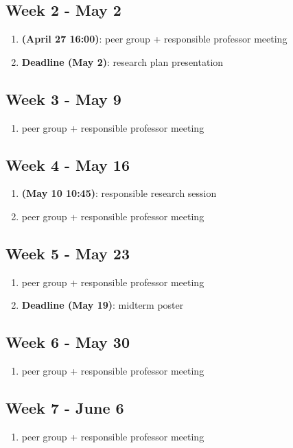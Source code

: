 \documentclass[english]{article}
\begin{document}
\subsection*{Week 2 - May 2}
\begin{enumerate}
\item \textbf{(April 27 16:00)}: peer group + responsible professor meeting
\item \textbf{Deadline (May 2)}: research plan presentation
\end{enumerate}

\subsection*{Week 3 - May 9}
\begin{enumerate}
\item peer group + responsible professor meeting
\end{enumerate}

\subsection*{Week 4 - May 16}
\begin{enumerate}
\item \textbf{(May 10 10:45)}: responsible research session
\item peer group + responsible professor meeting
\end{enumerate}

\subsection*{Week 5 - May 23}
\begin{enumerate}
\item peer group + responsible professor meeting
\item \textbf{Deadline (May 19)}: midterm poster
\end{enumerate}

\subsection*{Week 6 - May 30}
\begin{enumerate}
\item peer group + responsible professor meeting
\end{enumerate}

\subsection*{Week 7 - June 6}
\begin{enumerate}
\item peer group + responsible professor meeting
\end{enumerate}
\end{document}
